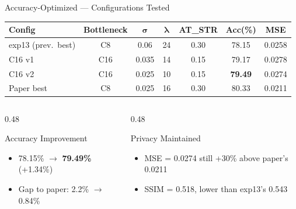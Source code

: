 \documentclass[aspectratio=169, 10pt]{beamer}
\newcommand{\good}[1]{\textcolor{goodgreen}{#1}}
\begin{document}
\begin{frame}{Accuracy-Optimized --- Configurations Tested}

\begin{center}
\renewcommand{\arraystretch}{1.2}
\small
\begin{tabular}{l c c c c c c}
\toprule
\textbf{Config} & \textbf{Bottleneck} & $\boldsymbol{\sigma}$ & $\boldsymbol{\lambda}$ & \textbf{AT\_STR} & \textbf{Acc(\%)} & \textbf{MSE} \\
\midrule
exp13 (prev.\ best) & C8 & 0.06 & 24 & 0.30 & 78.15 & 0.0258 \\
\hdashline
C16 v1 & \good{C16} & 0.035 & 14 & 0.15 & 79.17 & 0.0278 \\
\rowcolor{green!10}
C16 v2 & \good{C16} & 0.025 & 10 & 0.15 & \textbf{79.49} & 0.0274 \\
\midrule
Paper best & C8 & 0.025 & 16 & 0.30 & 80.33 & 0.0211 \\
\bottomrule
\end{tabular}
\end{center}

\vspace{0.2cm}

\begin{columns}[T]
\begin{column}{0.48\textwidth}
\begin{block}{\small Accuracy Improvement}
\begin{itemize}\small
    \item 78.15\% $\to$ \good{\textbf{79.49\%}} (+1.34\%)
    \item Gap to paper: 2.2\% $\to$ \good{0.84\%}
\end{itemize}
\end{block}
\end{column}
\begin{column}{0.48\textwidth}
\begin{block}{\small Privacy Maintained}
\begin{itemize}\small
    \item MSE = 0.0274 still \good{+30\%} above paper's 0.0211
    \item SSIM = 0.518, lower than exp13's 0.543
\end{itemize}
\end{block}
\end{column}
\end{columns}

\end{frame}
\end{document}
